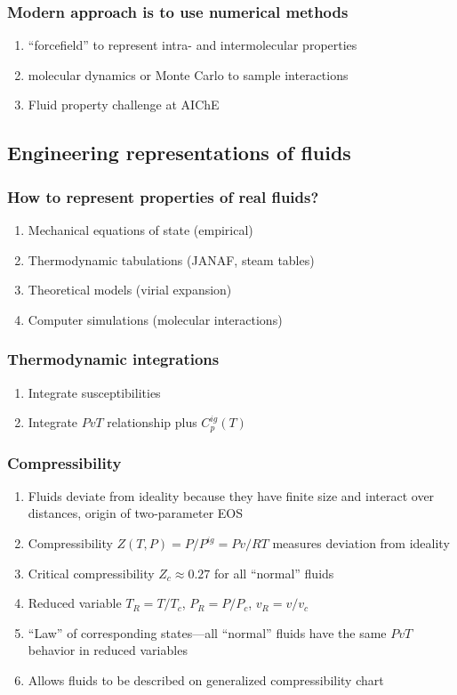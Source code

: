 \documentclass[11pt]{article}
\begin{document}
\subsubsection{Modern approach is to use numerical methods}
\label{sec:org8a3f12c}
\begin{enumerate}
\item ``forcefield'' to represent intra- and intermolecular properties
\item molecular dynamics or Monte Carlo to sample interactions
\item Fluid property challenge at AIChE
\end{enumerate}

\subsection{Engineering representations of fluids}
\label{sec:org140662f}
\subsubsection{How to represent properties of real fluids?}
\label{sec:org665b487}
\begin{enumerate}
\item Mechanical equations of state (empirical)
\item Thermodynamic tabulations (JANAF, steam tables)
\item Theoretical models (virial expansion)
\item Computer simulations (molecular interactions)
\end{enumerate}

\subsubsection{Thermodynamic integrations}
\label{sec:orgdd254a4}
\begin{enumerate}
\item Integrate susceptibilities
\item Integrate \(PvT\) relationship plus \(C_p^{ig}(T)\)
\end{enumerate}

\subsubsection{Compressibility}
\label{sec:org189fcc2}
\begin{enumerate}
\item Fluids deviate from ideality because they have finite size and interact over distances, origin of two-parameter EOS
\item Compressibility \(Z(T,P)=P/P^{ig}=Pv/RT\) measures deviation from ideality
\item Critical compressibility \(Z_c \approx 0.27\) for all ``normal'' fluids
\item Reduced variable \(T_R=T/T_c\), \(P_R = P/P_c\), \(v_R = v/v_c\)
\item ``Law'' of corresponding states---all ``normal'' fluids have the same \(PvT\) behavior in reduced variables
\item Allows fluids to be described on generalized compressibility chart
\end{enumerate}
\end{document}
